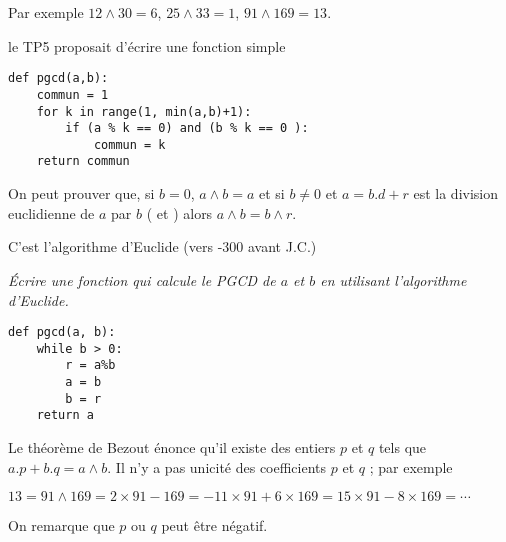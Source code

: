 Par exemple $12 \wedge 30 = 6$, $25\wedge 33 = 1$, $91\wedge 169 = 13$.

le TP5 proposait d'écrire une fonction simple
\begin{lstlisting}
def pgcd(a,b):
    commun = 1
    for k in range(1, min(a,b)+1):
        if (a % k == 0) and (b % k == 0 ):
            commun = k
    return commun
\end{lstlisting}
On peut prouver que, si $b = 0$, $a\wedge b=a$ et si $b\ne 0$ et $a = b.d + r$ est la division euclidienne de $a$ par $b$ ( et ) alors $a\wedge b = b\wedge r$. 

C'est l'algorithme d'Euclide (vers -300 avant J.C.)
\begin{Exercise}[title = Diviseurs]
\it Écrire une fonction  qui calcule le PGCD de $a$ et $b$ en utilisant l'algorithme d'Euclide.
\end{Exercise}
\begin{Answer}
\begin{lstlisting}
def pgcd(a, b):
    while b > 0:
        r = a%b
        a = b
        b = r
    return a
\end{lstlisting}
\end{Answer}

Le théorème de Bezout énonce qu'il existe des entiers $p$ et $q$ tels que $a.p + b.q = a\wedge b$. Il n'y a pas unicité des coefficients $p$ et $q$ ; par exemple

$13 = 91\wedge 169 = 2\times 91 - 169 = -11\times 91 + 6\times 169 = 15\times91 - 8\times 169 = \cdots$

On remarque que $p$ ou $q$ peut être négatif.

